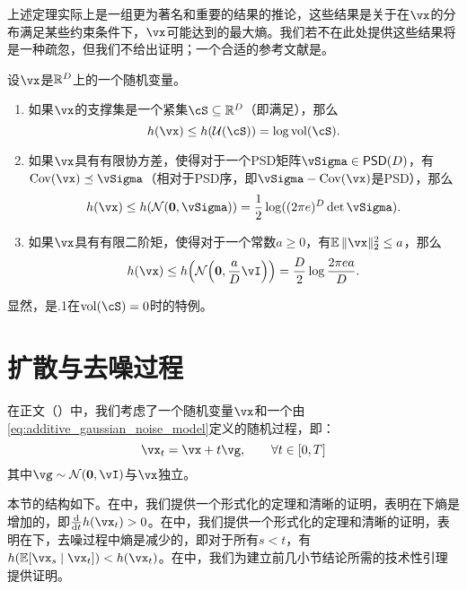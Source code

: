 \documentclass[../../book-main_zh.tex]{subfiles}
\begin{document}
上述定理实际上是一组更为著名和重要的结果的推论，这些结果是关于在\(\vx\)的分布满足某些约束条件下，\(\vx\)可能达到的最大熵。我们若不在此处提供这些结果将是一种疏忽，但我们不给出证明；一个合适的参考文献是\cite{poliyanski2024information}。
\begin{theorem}\label{thmx:max_entropy}
    设\(\vx\)是\(\mathbb{R}^{D}\)上的一个随机变量。
    \begin{enumerate}
        \item 如果\(\vx\)的支撑集是一个紧集\(\cS \subseteq \R^{D}\)（即满足），那么
        \begin{equation}
            h(\vx) \leq h(\dUnif(\cS)) = \log \volume(\cS).
        \end{equation}
        \item 如果\(\vx\)具有有限协方差，使得对于一个PSD矩阵\(\vSigma \in \PSD(D)\)，有\(\Cov(\vx) \preceq \vSigma\)（相对于PSD序，即\(\vSigma - \Cov(\vx)\)是PSD），那么
        \begin{equation}
            h(\vx) \leq h(\dNorm(\vzero, \vSigma)) = \frac{1}{2}\log((2\pi e)^{D}\det\vSigma).
        \end{equation}
        \item 如果\(\vx\)具有有限二阶矩，使得对于一个常数\(a \geq 0\)，有\(\Ex\norm{\vx}_{2}^{2} \leq a\)，那么
        \begin{equation}
            h(\vx) \leq h\rp{\dNorm\rp{\vzero, \frac{a}{D}\vI}} = \frac{D}{2}\log\frac{2\pi e a}{D}.
        \end{equation}
    \end{enumerate}
\end{theorem}
显然，是.1在\(\volume(\cS) = 0\)时的特例。

\section{扩散与去噪过程}\label{sec:entropy_diffusion}

在正文（）中，我们考虑了一个随机变量\(\vx\)和一个由\eqref{eq:additive_gaussian_noise_model}定义的随机过程，即：
\begin{equation}\label{eq:app_additive_gaussian_noise_model}
    \vx_{t} = \vx + t\vg, \qquad  \forall t \in [0, T]
\end{equation}
其中\(\vg \sim \dNorm(\vzero, \vI)\)与\(\vx\)独立。

本节的结构如下。在中，我们提供一个形式化的定理和清晰的证明，表明在下熵是增加的，即\(\odv*{h(\vx_{t})}{t} > 0\)。在中，我们提供一个形式化的定理和清晰的证明，表明在下，去噪过程中熵是减少的，即对于所有\(s < t\)，有\(h(\Ex[\vx_{s} \given \vx_{t}]) < h(\vx_{t})\)。在中，我们为建立前几小节结论所需的技术性引理提供证明。
\end{document}

